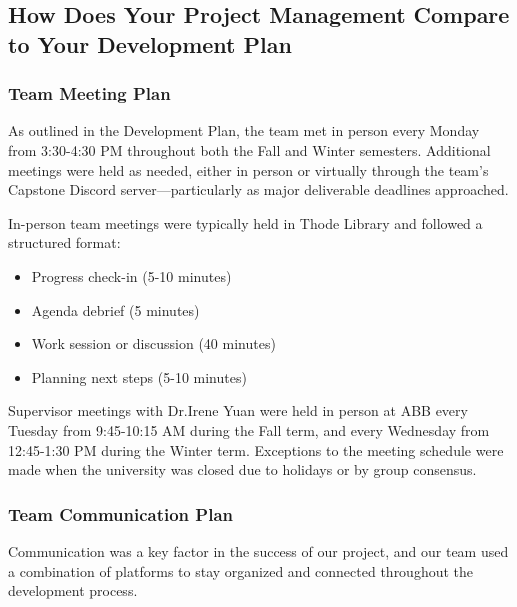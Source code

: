 \documentclass{article}
\begin{document}

\subsection{How Does Your Project Management Compare to Your Development Plan}

\subsubsection{Team Meeting Plan}

As outlined in the Development Plan, the team met in person every Monday from 3:30-4:30 PM throughout both the Fall and Winter semesters. Additional meetings were held as needed, either in person or virtually through the team's Capstone Discord server—particularly as major deliverable deadlines approached.

In-person team meetings were typically held in Thode Library and followed a structured format:
\begin{itemize}
    \item Progress check-in (5-10 minutes)
    \item Agenda debrief (5 minutes)
    \item Work session or discussion (40 minutes)
    \item Planning next steps (5-10 minutes)
\end{itemize}
Supervisor meetings with Dr.Irene Yuan were held in person at ABB every Tuesday from 9:45-10:15 AM during the Fall term, and every Wednesday from 12:45-1:30 PM during the Winter term. Exceptions to the meeting schedule were made when the university was closed due to holidays or by group consensus.

\subsubsection{Team Communication Plan}

Communication was a key factor in the success of our project, and our team used a combination of platforms to stay organized and connected throughout the development process.
\end{document}
